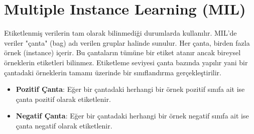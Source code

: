 \section{Multiple Instance Learning (MIL)}

Etiketlenmiş verilerin tam olarak bilinmediği durumlarda kullanılır. MIL'de veriler "çanta" (bag) adı verilen gruplar halinde sunulur. Her çanta, birden fazla örnek (instance) içerir. Bu çantaların tümüne bir etiket atanır ancak bireysel örneklerin etiketleri bilinmez. Etiketleme seviyesi çanta bazında yapılır yani bir çantadaki örneklerin tamamı üzerinde bir sınıflandırma gerçekleştirilir. 

\begin{itemize}
    \item \textbf{Pozitif Çanta}: Eğer bir çantadaki herhangi bir örnek pozitif sınıfa ait ise çanta pozitif olarak etiketlenir.
    \item \textbf{Negatif Çanta}: Eğer bir çantadaki herhangi bir örnek negatif sınıfa ait ise çanta negatif olarak etiketlenir.
\end{itemize}

\newpage